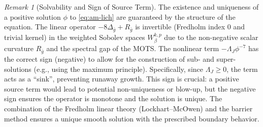 \documentclass[12pt]{article}
\theoremstyle{plain}
\theoremstyle{definition}
\theoremstyle{remark}
\newtheorem{remark}[theorem]{Remark}
\newcommand{\bg}{\bar{g}}
\begin{document}
\begin{remark}[Solvability and Sign of Source Term]\label{rem:lich-solvability}
The existence and uniqueness of a positive solution $\phi$ to \eqref{eq:am-lich} are guaranteed by the structure of the equation. The linear operator $-8\Delta_{\bg} + R_{\bg}$ is invertible (Fredholm index 0 and trivial kernel) in the weighted Sobolev spaces $W^{k,p}_\beta$ due to the non-negative scalar curvature $R_{\bg}$ and the spectral gap of the MOTS. The nonlinear term $-\Lambda_J \phi^{-7}$ has the correct sign (negative) to allow for the construction of sub- and super-solutions (e.g., using the maximum principle). Specifically, since $\Lambda_J \geq 0$, the term acts as a ``sink'', preventing runaway growth. This sign is crucial: a positive source term would lead to potential non-uniqueness or blow-up, but the negative sign ensures the operator is monotone and the solution is unique. The combination of the Fredholm linear theory (Lockhart--McOwen) and the barrier method ensures a unique smooth solution with the prescribed boundary behavior.
\end{remark}
\end{document}
